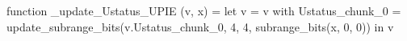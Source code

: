 function _update_Ustatus_UPIE (v, x) = let v = { v with Ustatus_chunk_0 = update_subrange_bits(v.Ustatus_chunk_0, 4, 4, subrange_bits(x, 0, 0)) } in
  v
